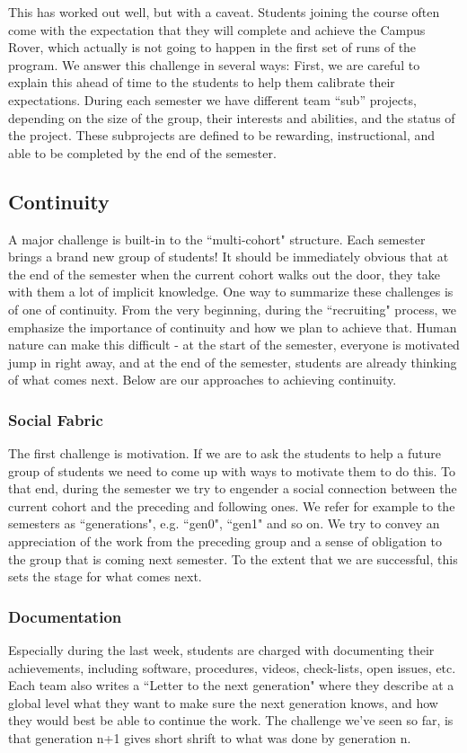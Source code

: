 This has worked out well, but with a caveat. Students joining the course often come with the expectation that they will complete and achieve the Campus Rover, which actually is not going to happen in the first set of runs of the program. We answer this challenge in several ways: First, we are careful to explain this ahead of time to the students to help them calibrate their expectations. During each semester we have different team ``sub'' projects, depending on the size of the group, their interests and abilities, and the status of the project. These subprojects are defined to be rewarding, instructional, and able to be completed by the end of the semester.

\subsection{Continuity}A major challenge is built-in to the ``multi-cohort" structure. Each semester brings a brand new group of students! It should be immediately obvious that at the end of the semester when the current cohort walks out the door, they take with them a lot of implicit knowledge. One way to summarize these challenges is of one of continuity. From the very beginning, during the ``recruiting" process, we emphasize the importance of continuity and how we plan to achieve that. Human nature can make this difficult - at the start of the semester, everyone is motivated jump in right away, and at the end of the semester, students are already thinking of what comes next. Below are our approaches to achieving continuity.

\subsubsection{Social Fabric}The first challenge is motivation. If we are to ask the students to help a future group of students we need to come up with ways to motivate them to do this. To that end, during the semester we try to engender a social connection between the current cohort and the preceding and following ones. We refer for example to the semesters as ``generations", e.g. ``gen0", ``gen1" and so on. We try to convey an appreciation of the work from the preceding group and a sense of obligation to the group that is coming next semester. To the extent that we are successful, this sets the stage for what comes next.

\subsubsection{Documentation}Especially during the last week, students are charged with documenting their achievements, including software, procedures, videos, check-lists, open issues, etc. Each team also writes a ``Letter to the next generation" where they describe at a global level what they want to make sure the next generation knows, and how they would best be able to continue the work. The challenge we've seen so far, is that generation n+1 gives short shrift to what was done by generation n.

